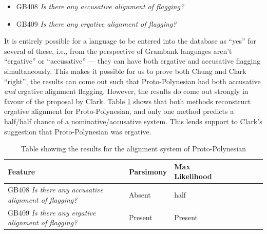 \documentclass[draft,10pt]{article} %
\begin{document}
\begin{itemize}
\item GB408 \emph{Is there any accusative alignment of flagging?}
\item GB409 \emph{Is there any ergative alignment of flagging?}
\end{itemize}

It is entirely possible for a language to be entered into the database as ``yes'' for several of these, i.e., from the perspective of Grambank languages aren't ``ergative'' or ``accusative'' --- they can have both ergative and accusative flagging simultaneously. This makes it possible for us to prove both Chung and Clark ``right'', the results can come out such that Proto-Polynesian had both accusative \emph{and} ergative alignment flagging. However, the results do come out strongly in favour of the proposal by Clark. Table \ref{proto_poly_erg_table} shows that both methods reconstruct ergative alignment for Proto-Polynesian, and only one method predicts a half/half chance of a nominative/accusative system. This lends support to Clark's suggestion that Proto-Polynesian was ergative.

\begin{table}[H]
\centering
\caption{Table showing the results for the alignment system of Proto-Polynesian}
\label{proto_poly_erg_table}
\begin{tabular}{|l|l|l|l|l|l|l|l|}
\hline
Feature & \textbf{Parsimony}& \textbf{Max Likelihood} \\ \hline
GB408 \emph{Is there any accusative alignment of flagging?} &Absent & half \\
GB409 \emph{Is there any ergative alignment of flagging?} & Present & Present \\
\end{tabular}
\end{table}
\end{document}
